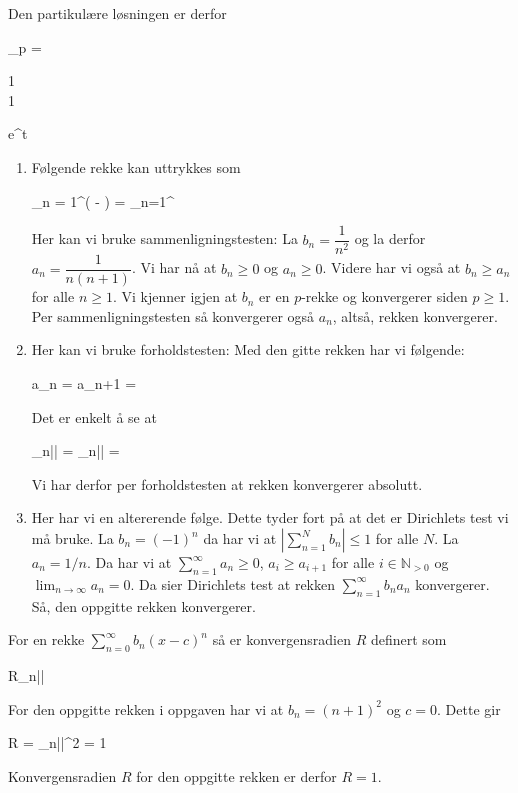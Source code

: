 Den partikulære løsningen er derfor
\begin{likning}
	_p = \begin{pmatrix}
		1\\1
	\end{pmatrix} e^t
\end{likning}

\oppgave
\deloppgave
\begin{enumerate}
	\item Følgende rekke kan uttrykkes som
	\begin{likning}
		\sum_{n = 1}^\infty \left( - \right) = \sum_{n=1}^\infty {}
	\end{likning}
	Her kan vi bruke sammenligningstesten: La $b_n = \dfrac{1}{n^2}$ og la derfor $a_n = \dfrac{1}{n(n+1)}$. Vi har nå at $b_n \geq 0$ og $a_n \geq 0$. Videre har vi også at $b_n \geq a_n$ for alle $n \geq 1$. Vi kjenner igjen at $b_n$ er en $p$-rekke og konvergerer siden $p \geq 1$. Per sammenligningstesten så konvergerer også $a_n$, altså, rekken konvergerer.
	
	\item Her kan vi bruke forholdstesten: Med den gitte rekken har vi følgende:
	\begin{likning}
		a_n =  \implies a_{n+1} = \frac{1}{2^{n+1}} 
	\end{likning}
	Det er enkelt å se at
	\begin{likning}
		\lim_{n\to\infty}\left|\right| = \lim_{n\to\infty}\left|\right| = \frac{1}{2}
	\end{likning}
	Vi har derfor per forholdstesten at rekken konvergerer absolutt.
	
	\item Her har vi en altererende følge. Dette tyder fort på at det er Dirichlets test vi må bruke. La $b_n = (-1)^n$ da har vi at $\left|\sum_{n = 1}^N b_n\right| \leq 1$ for alle $N$. La $a_n = 1/n$. Da har vi at $\sum_{n = 1}^{\infty} a_n \geq 0$, $a_i \geq a_{i+1}$ for alle $i\in\mathbb{N}_{>0}$ og $\lim_{n\to\infty} a_n = 0$. Da sier Dirichlets test at rekken $\sum_{n=1}^\infty b_na_n$ konvergerer. Så, den oppgitte rekken konvergerer.
\end{enumerate}

\deloppgave
For en rekke $\sum_{n=0}^\infty b_n(x-c)^n$ så er konvergensradien $R$ definert som
\begin{likning}
	R\equiv \lim_{n\to\infty}\left|\right|
\end{likning}
For den oppgitte rekken i oppgaven har vi at $b_n = (n+1)^2$ og $c = 0$. Dette gir
\begin{likning}
	R = \lim_{n\to\infty}\left|\right|^2 = 1
\end{likning}
Konvergensradien $R$ for den oppgitte rekken er derfor $R = 1$.

